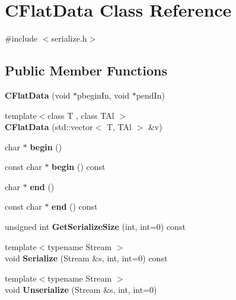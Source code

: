 \hypertarget{class_c_flat_data}{}\section{C\+Flat\+Data Class Reference}
\label{class_c_flat_data}


{\ttfamily \#include $<$serialize.\+h$>$}

\subsection*{Public Member Functions}
\begin{DoxyCompactItemize}
\item 
\mbox{\label{class_c_flat_data_afd4036c45c69e6b080f57d793e1bdf57}} 
{\bfseries C\+Flat\+Data} (void $\ast$pbegin\+In, void $\ast$pend\+In)
\item 
\mbox{\label{class_c_flat_data_aa536a3fe59b6cde08cf7ed57ecebedfb}} 
{\footnotesize template$<$class T , class T\+Al $>$ }\\{\bfseries C\+Flat\+Data} (std\+::vector$<$ T, T\+Al $>$ \&v)
\item 
\mbox{\label{class_c_flat_data_ac8131cc3aec84905d7786fb19ff8953d}} 
char $\ast$ {\bfseries begin} ()
\item 
\mbox{\label{class_c_flat_data_a0c771a8143c468a9f7add8b3d9736212}} 
const char $\ast$ {\bfseries begin} () const
\item 
\mbox{\label{class_c_flat_data_ae88ae9f4121ff18aa8e29a3a40d7ee67}} 
char $\ast$ {\bfseries end} ()
\item 
\mbox{\label{class_c_flat_data_af5c2476dcbc0ec0d4f9051df3cdb756d}} 
const char $\ast$ {\bfseries end} () const
\item 
\mbox{\label{class_c_flat_data_ae47ed62d67cc6d923d6c8f9dde7a940c}} 
unsigned int {\bfseries Get\+Serialize\+Size} (int, int=0) const
\item 
\mbox{\label{class_c_flat_data_a97449211175d7fbbb88830cbba808132}} 
{\footnotesize template$<$typename Stream $>$ }\\void {\bfseries Serialize} (Stream \&s, int, int=0) const
\item 
\mbox{\label{class_c_flat_data_a3da79327bf2937113de502182ee227b9}} 
{\footnotesize template$<$typename Stream $>$ }\\void {\bfseries Unserialize} (Stream \&s, int, int=0)
\end{DoxyCompactItemize}
